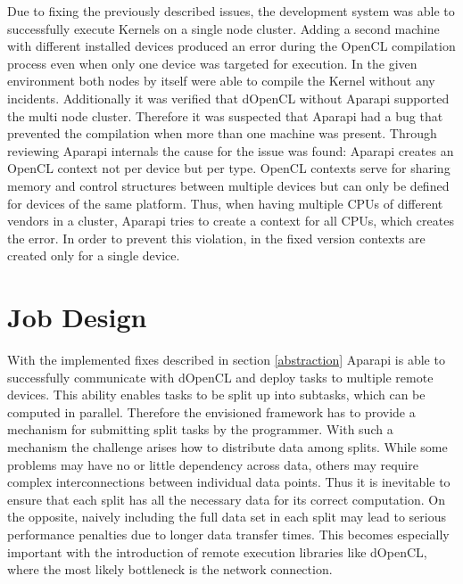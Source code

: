 \begin{description}[style=nextline]
	\item [Failed compilations when using multiple devices]
	Due to fixing the previously described issues, the development system was able to successfully execute Kernels on a single node cluster. Adding a second machine with different installed devices produced an error during the OpenCL compilation process even when only one device was targeted for execution. In the given environment both nodes by itself were able to compile the Kernel without any incidents. Additionally it was verified that dOpenCL without Aparapi supported the multi node cluster. Therefore it was suspected that Aparapi had a bug that prevented the compilation when more than one machine was present. Through reviewing Aparapi internals the cause for the issue was found: Aparapi creates an OpenCL context not per device but per type. OpenCL contexts serve for sharing memory and control structures between multiple devices but can only be defined for devices of the same platform. Thus, when having multiple CPUs of different vendors in a cluster, Aparapi tries to create a context for all CPUs, which creates the error. In order to prevent this violation, in the fixed version contexts are created only for a single device.
	
\end{description} 
 

\section{Job Design}

With the implemented fixes described in section \ref{abstraction} Aparapi is able to successfully communicate with dOpenCL and deploy tasks to multiple remote devices. This ability enables tasks to be split up into subtasks, which can be computed in parallel. Therefore the envisioned framework has to provide a mechanism for submitting split tasks by the programmer. With such a mechanism the challenge arises how to distribute data among splits. While some problems may have no or little dependency across data, others may require complex interconnections between individual data points. Thus it is inevitable to ensure that each split has all the necessary data for its correct computation. On the opposite, naively including the full data set in each split may lead to serious performance penalties due to longer data transfer times. This becomes especially important with the introduction of remote execution libraries like dOpenCL, where the most likely bottleneck is the network connection.

